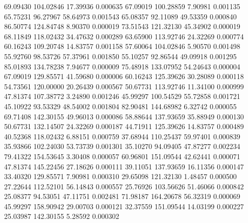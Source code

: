        69.09430      104.02846       17.39936       0.000635
       67.09019      100.28859        7.90981       0.001135
       65.75231       96.27967       58.64973       0.001543
       65.08357       92.11089       49.53359       0.000840
       86.50774      124.84748        8.90370       0.000019
       73.51543      121.32130       45.34902       0.000019
       68.11849      118.02432       34.47632       0.000289
       63.65900      113.92746       24.32269       0.000774
       60.16243      109.20748       14.83757       0.001158
       57.60064      104.02846        5.90570       0.001498
       55.92760       98.53726       57.37961       0.001850
       55.10257       92.86544       49.09918       0.001295
       85.01893      134.78238        7.94677       0.000009
       75.48918      133.07952       54.24643       0.000004
       67.09019      129.85571       41.59680       0.000006
       60.16243      125.39626       30.28089       0.000118
       54.73561      120.00000       20.26439       0.000567
       50.67731      113.92746       11.34100       0.000999
       47.81374      107.38772        3.24890       0.001246
       45.99297      100.54529       55.72858       0.001721
       45.10922       93.53329       48.54002       0.001804
       82.90481      144.68982        6.32742       0.000055
       69.71408      142.30155       49.96013       0.000086
       58.88644      137.93659       35.88949       0.000130
       50.67731      132.14507       24.32269       0.000187
       44.71911      125.39626       14.83757       0.000489
       40.52368      118.02432        6.88151       0.000759
       37.68944      110.25437       59.97401       0.000839
       35.93866      102.24030       53.73739       0.001301
       35.10270       94.09405       47.87277       0.002234
       79.41322      154.53645        3.30408       0.000057
       60.96801      151.09544       42.62441       0.000071
       47.81374      145.22456       27.18626       0.000111
       39.11051      137.93659       16.11356       0.000147
       33.40320      129.85571        7.90981       0.000310
       29.65098      121.32130        1.48457       0.000500
       27.22644      112.52101       56.14843       0.000557
       25.76926      103.56626       51.46066       0.000842
       25.08377       94.53051       47.11751       0.002481
       71.98187      164.20678       56.32319       0.000069
       45.99297      158.90942       29.00703       0.000121
       32.37559      151.09544       14.03199       0.000227
       25.03987      142.30155        5.28592       0.000302
